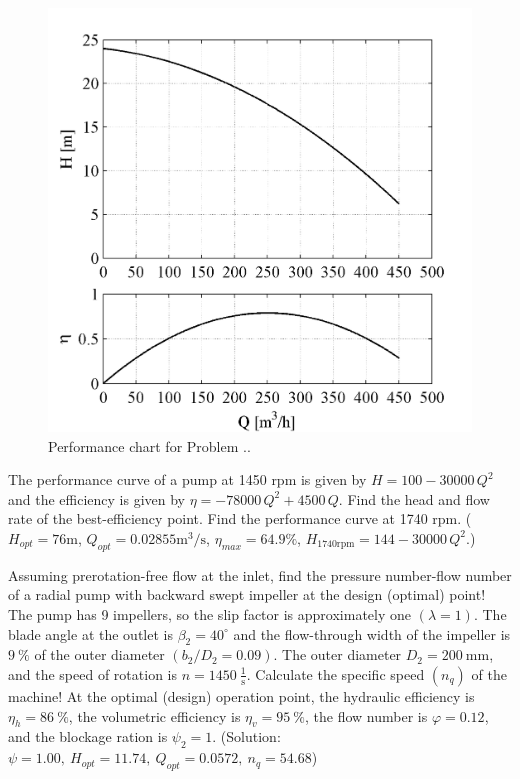 \begin{figure}[!h]
\begin{center}
\centering
\includegraphics{Problem_solving/figs/PS_PerfCurves.png}
\caption{\label{fig:PS_PerfCurves}Performance chart for Problem \thesection.\theprob.}
\end{center}
\end{figure}

\vspace{1cm}

The performance curve of a pump at 1450 rpm is given by $H=100-30000\,Q^2$ and the efficiency is given by $\eta=-78000\,Q^2+4500\,Q$. Find the head and flow rate of the best-efficiency point. Find the performance curve at 1740 rpm. ($H_{opt}=76$m, $Q_{opt}=0.02855\mathrm{m^3/s}$, $\eta_{max}=64.9\%$, $H_{1740\mathrm{rpm}}=144-30000\,Q^2$.)

\vspace{1cm}

Assuming prerotation-free flow at the inlet, find the pressure number-flow number of a radial pump with backward swept impeller at the design (optimal) point! The pump has 9 impellers, so the slip factor is approximately one $(\lambda=1)$. The blade angle at the outlet is $\beta_2=40^{\circ}$ and the flow-through width of the impeller is $9~\%$ of the outer diameter $(b_2/D_2=0.09)$. The outer diameter $D_2=200~\mathrm{mm}$, and the speed of rotation is $n=1450~\frac{1}{\mathrm{s}}$. Calculate the specific speed $(n_q)$ of the machine! At the optimal (design) operation point, the hydraulic efficiency is $\eta_h=86~\%$, the volumetric efficiency is $\eta_v=95~\%$, the flow number is $\varphi=0.12$, and the blockage ration is $\psi_2=1$. (Solution: $\psi=1.00,~H_{opt}=11.74,~Q_{opt}=0.0572,~n_q=54.68$)

